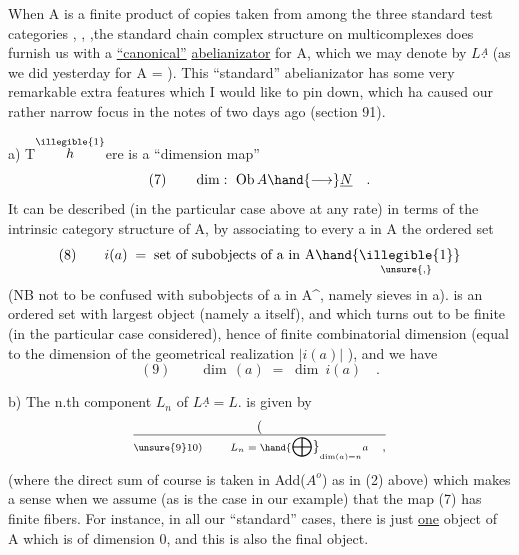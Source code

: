 
When A is a finite product of copies taken from among the three
standard test categories \hand{$\Delta$},\hand{$\square$} , ,the standard chain complex structure
on multicomplexes does furnish us with a \uline{``canonical''} \uline{abelianizator}
for A, which we may denote by $L\overset{A}{.}$ (as we did yesterday for A =\hand{$\Delta$} ).
This ``standard'' abelianizator has some very remarkable extra features
which I would like to pin down,  which ha caused our rather narrow
focus in the notes of two days ago (section 91).

a) T$\overset{\illegible{1}}{h}$ere is a ``dimension map''
\[ (7) \qquad \dim:\ \mathrm{Ob}\,A \hand{\longrightarrow} \underline{N} \quad . \]
It can be described (in the particular case above at any rate) in terms
of the intrinsic category structure of A, by associating to every a in
A the ordered set
\[ (8) \qquad i(a) \;=\; \text{set of subobjects of a in A} \hand{\underset{\unsure{,}}{\illegible{1}}} \]
(NB not to be confused with subobjects of a in A\^{}, namely sieves in
a).  is an ordered set with  largest object  (namely a itself),
and which turns out to be finite (in the particular case considered),
hence of finite combinatorial dimension (equal to the dimension of the
geometrical realization $|i(a)|$ ), and we have
\[ (9) \qquad \dim\,(a) \;=\; \dim\ i(a) \quad . \]

b) The n.th component $L_n$ of $L\overset{A}{.} = L.$ is given by
\[ (\over{\unsure{9}}{1}0) \qquad L_n \;=\; \hand{\displaystyle\bigoplus}_{\dim(a)=n} a \quad , \]
(where the direct sum of course is taken in Add($A^{o}$) as in (2) above\hand{,})
which makes a sense when we assume (as is the case in our example)
that the map (7)   has finite fibers. For instance, in
all  our ``standard'' cases, there is just \uline{one} object of A which is
of dimension 0,  and this is also the final object.

